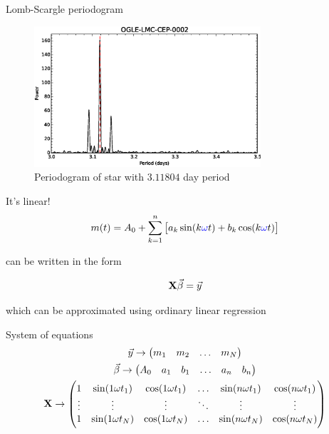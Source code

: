 \documentclass{beamer}
\begin{document}
\begin{frame}{Lomb-Scargle periodogram}
  \begin{figure}[ht]
    \centering
    \includegraphics[width=0.75\textwidth]{img/periodogram}
    \caption*{Periodogram of star with $3.11804$ day period}
  \end{figure}
\end{frame}


\begin{frame}{It's linear!}
  \begin{displaymath}
    m(t) =
    A_0 +
    \sum_{k=1}^n \qty[
      a_k \sin(k {\color{blue} \omega} t) +
      b_k \cos(k {\color{blue} \omega} t)
    ]
  \end{displaymath}
  \begin{center}
    can be written in the form
  \end{center}
  \begin{displaymath}
    \vb{X} \vec\beta = \vec{y}
  \end{displaymath}
  \begin{center}
    which can be approximated using ordinary linear regression
  \end{center}
\end{frame}

\begin{frame}{System of equations}
  \begin{gather*}
    \vec{y} \to \mqty(m_1 & m_2 & \ldots & m_N)
    \\
    \vec\beta \to \mqty(A_0 & a_1 & b_1 & \ldots & a_n & b_n)
    \\
    \vb{X} \to \mqty(
      1 & \sin(1 \omega t_1) & \cos(1 \omega t_1) & \ldots &
          \sin(n \omega t_1) & \cos(n \omega t_1)
      \\
      \vdots & \vdots & \vdots & \ddots & \vdots & \vdots
      \\
      1 & \sin(1 \omega t_N) & \cos(1 \omega t_N) & \ldots &
          \sin(n \omega t_N) & \cos(n \omega t_N)
    )
  \end{gather*}
\end{frame}
\end{document}
